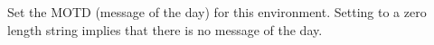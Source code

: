 Set the MOTD (message of the day) for this environment. Setting to a zero length string implies that there is no message of the day.

